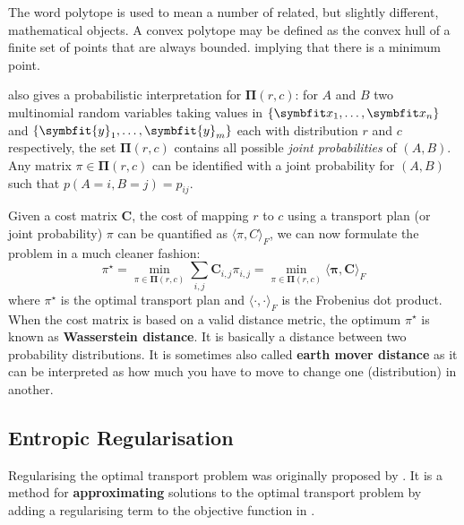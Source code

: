 \begin{tcolorbox}[title=Polytope]
The word polytope is used to mean a number of related, but slightly different, mathematical objects. A convex polytope may be defined as the convex hull of a finite set of points that are always bounded.  implying that there is a minimum point.
\end{tcolorbox}

\textcite{cuturi2013sinkhorn} also gives a probabilistic interpretation for $\symbf{\Pi}(r, c)$: for $A$ and $B$ two multinomial random variables taking values in  $\{\bfitx_1, \ldots, \bfitx_n\}$ and  $\{\symbfit{y}_1, \ldots, \symbfit{y}_m\}$ each with distribution $r$ and $c$ respectively, the set $\symbf{\Pi}(r, c)$ contains all possible \textit{joint probabilities} of $(A, B)$. Any matrix $\pi \in \symbf{\Pi}(r, c)$ can be identified with a joint probability for $(A, B)$ such that $p(A = i, B = j) = p_{ij}$.

Given a cost matrix $\symbf{C}$, the cost of mapping $r$ to $c$ using a transport plan (or joint probability) $\pi$ can be quantified as $\langle \pi, C \rangle_{F}$, we can now formulate the problem in a much cleaner fashion:
\begin{equation}
    \pi^\star = \min_{\pi \in \symbf{\Pi}(r, c)} \sum_{i,j} \symbf{C}_{i,j}{\pi}_{i,j} = \min_{\pi \in \symbf{\Pi}(r, c)} \langle \symbf{\pi}, \symbf{C} \rangle_{F}
    \label{eqn:ot-objective-relaxed}
\end{equation}
where $\pi^\star$ is the optimal transport plan and $\langle \cdot, \cdot \rangle_{F}$ is the Frobenius dot product. When the cost matrix is based on a valid distance metric, the optimum $\pi^\star$ is known as \textbf{Wasserstein distance}. It is basically a distance between two probability distributions. It is sometimes also called \textbf{earth mover distance} as it can be interpreted as how much  you have to move to change one  (distribution) in another.

\subsection{Entropic Regularisation}\label{ssec:ot-entropic-reg}

Regularising the optimal transport problem was originally proposed by \textcite{hitchcock1941distribution}. It is a method for \textbf{approximating} solutions to the optimal transport problem by adding a regularising term to the objective function in .

